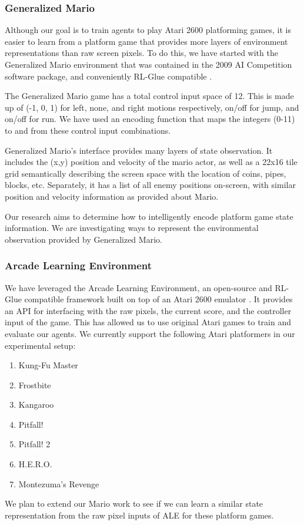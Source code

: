 \documentclass{article}
\begin{document}
\subsubsection{Generalized Mario}
Although our goal is to train agents to play Atari 2600 platforming games, it is easier to learn from a platform game that provides more layers of environment representations than raw screen pixels. To do this, we have started with the Generalized Mario environment that was contained in the 2009 AI Competition software package, and conveniently RL-Glue compatible \cite{Togelius10}.

The Generalized Mario game has a total control input space of 12. This is made up of (-1, 0, 1) for left, none, and right motions respectively, on/off for jump, and on/off for run. We have used an encoding function that maps the integers (0-11) to and from these control input combinations. 

Generalized Mario's interface provides many layers of state observation. It includes the (x,y) position and velocity of the mario actor, as well as a 22x16 tile grid semantically describing the screen space with the location of coins, pipes, blocks, etc. Separately, it has a list of all enemy positions on-screen, with similar position and velocity information as provided about Mario. 

Our research aims to determine how to intelligently encode platform game state information. We are investigating ways to represent the environmental observation provided by Generalized Mario.

\subsubsection{Arcade Learning Environment}
We have leveraged the Arcade Learning Environment, an open-source and RL-Glue compatible framework built on top of an Atari 2600 emulator \cite{bellemare13}.  It provides an API for interfacing with the raw pixels, the current score, and the controller input of the game. This has allowed us to use original Atari games to train and evaluate our agents. We currently support the following Atari platformers in our experimental setup:
\begin{multicols}{2}
\begin{enumerate} [topsep=0pt,itemsep=-1ex,partopsep=1ex,parsep=1ex]
\item Kung-Fu Master
\item Frostbite
\item Kangaroo
\item Pitfall!
\item Pitfall! 2
\item H.E.R.O.
\item Montezuma's Revenge
\end{enumerate}
\end{multicols}
We plan to extend our Mario work to see if we can learn a similar state representation from the raw pixel inputs of ALE for these platform games.
\end{document}
